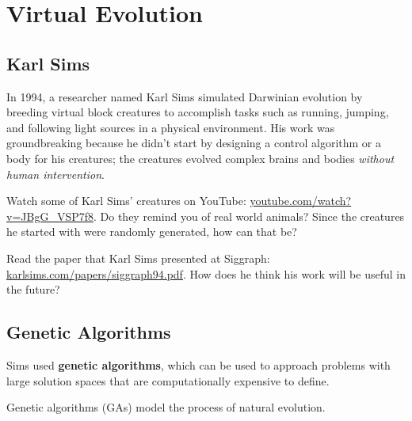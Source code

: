 \documentclass[10pt]{book}
\begin{document}
\mainmatter

\newcommand{\TODO}{\hl{\emph{TODO:}}\hl}

\chapter{Virtual Evolution}

\section{Karl Sims}

In 1994, a researcher named Karl Sims simulated Darwinian evolution by breeding 
virtual block creatures to accomplish tasks such as running, jumping, and following 
light sources in a physical environment. His work was groundbreaking because he didn't 
start by designing a control algorithm or a body for his creatures; the creatures 
evolved complex brains and bodies {\em without human intervention}. 

\begin{ex}
  Watch some of Karl Sims' creatures on YouTube:
  \url{youtube.com/watch?v=JBgG_VSP7f8}. Do they remind you of real world
  animals? Since the creatures he started with were randomly generated, how can that be?
\end{ex}

\begin{ex}
  Read the paper that Karl Sims presented at Siggraph:
  \url{karlsims.com/papers/siggraph94.pdf}. How does he think his
  work will be useful in the future?
\end{ex}

\section{Genetic Algorithms}

Sims used {\bf genetic algorithms}, which can be used to approach problems 
with large solution spaces that are computationally expensive to define.

Genetic algorithms (GAs) model the process of 
natural evolution. 

\end{document}
